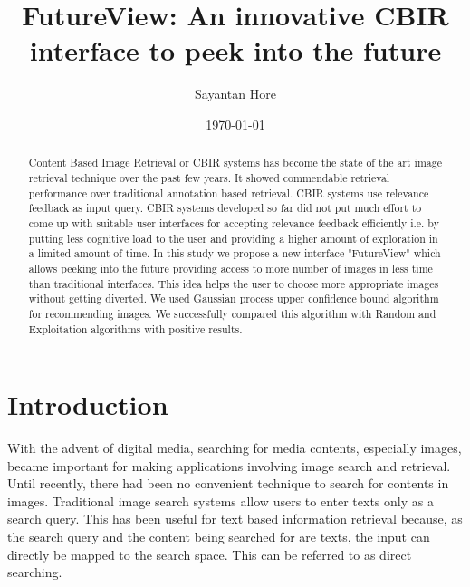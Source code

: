 \documentclass[english]{tktltiki}
\begin{document}
\onehalfspacing

\title{FutureView: An innovative CBIR interface to peek into the future}
\author{Sayantan Hore}
\date{\today}

\maketitle



\begin{abstract}

Content Based Image Retrieval or CBIR systems has become the state of the art image retrieval technique over the past few years. It showed commendable retrieval performance over traditional annotation based retrieval. CBIR systems use relevance feedback as input query. CBIR systems developed so far did not put much effort to come up with suitable user interfaces for accepting relevance feedback efficiently i.e. by putting less cognitive load to the user and providing a higher amount of exploration in a limited amount of time. In this study we propose a new interface "FutureView" which allows peeking into the future providing access to more number of images in less time than traditional interfaces. This idea helps the user to choose more appropriate images without getting diverted. We used Gaussian process upper confidence bound algorithm for recommending images. We successfully compared this algorithm with Random and Exploitation algorithms with positive results.

\end{abstract}

\mytableofcontents




\section{Introduction}

With the advent of digital media, searching for media contents, especially images, became important for making applications involving image search and retrieval. Until recently, there had been no convenient technique to search for contents in images. Traditional image search systems allow users to enter texts only as a search query. This has been useful for text based information retrieval because, as the search query and the content being searched for are texts, the input can directly be mapped to the search space. This can be referred to as direct searching.
\end{document}

